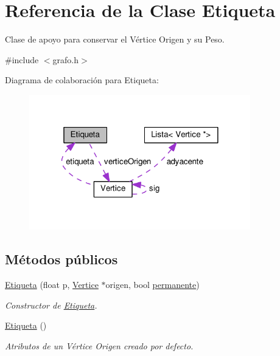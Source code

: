 \hypertarget{classEtiqueta}{}\section{Referencia de la Clase Etiqueta}
\label{classEtiqueta}


Clase de apoyo para conservar el Vértice Origen y su Peso.  




{\ttfamily \#include $<$grafo.\+h$>$}



Diagrama de colaboración para Etiqueta\+:\nopagebreak
\begin{figure}[H]
\begin{center}
\leavevmode
\includegraphics[width=272pt]{classEtiqueta__coll__graph}
\end{center}
\end{figure}
\subsection*{Métodos públicos}
\begin{DoxyCompactItemize}
\item 
\hyperlink{classEtiqueta_aa7f1cc55f5fed8f31cc176d375544349}{Etiqueta} (float p, \hyperlink{classVertice}{Vertice} $\ast$origen, bool \hyperlink{classEtiqueta_aa69958b23c24051acace2d464be55de4}{permanente})
\begin{DoxyCompactList}\small\item\em Constructor de \hyperlink{classEtiqueta}{Etiqueta}. \end{DoxyCompactList}\item 
\mbox{\label{classEtiqueta_aaf0b9fe57ea31a58b0dc4012cf8198a2}} 
\hyperlink{classEtiqueta_aaf0b9fe57ea31a58b0dc4012cf8198a2}{Etiqueta} ()
\begin{DoxyCompactList}\small\item\em Atributos de un Vértice Origen creado por defecto. \end{DoxyCompactList}\end{DoxyCompactItemize}
